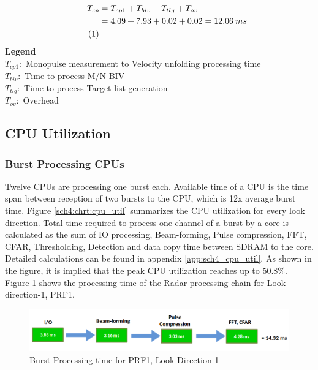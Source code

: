 \begin{align*}
\label{aa:scheme5:corr}
	T_{cp} &= T_{cp1} + T_{biv} + T_{tlg} +T_{ov} \\
	&= 4.09 + 7.93 + 0.02 + 0.02 = 12.06 \: ms \\ \stepcounter{equation}\tag{\theequation} 
\end{align*}
\noindent 
\textbf{Legend}\\
\tab $T_{cp1}:$ Monopulse measurement to Velocity unfolding processing time \\
\tab $T_{biv}:$ Time to process M/N BIV \\
\tab $T_{tlg}:$ Time to process Target list generation \\
\tab $T_{ov}:$ Overhead

\subsection{CPU Utilization}
\label{ss:mm:scheme5:cpu_load}
\subsubsection{Burst Processing CPUs}
Twelve CPUs are processing one burst each. Available time of a CPU is the time span between reception of two bursts to the CPU, which is 12x average burst time. Figure \ref{sch4:chrt:cpu_util} summarizes the CPU utilization for every look direction. Total time required to process one channel of a burst by a core is calculated as the sum of IO processing, Beam-forming, Pulse compression, FFT, CFAR, Thresholding, Detection and data copy time between SDRAM to the core. Detailed calculations can be found in appendix \ref{app:sch4_cpu_util}. As shown in the figure, it is implied that the peak CPU utilization reaches up to 50.8\%. Figure \ref{fig:mm:sch4_proc_time_chrt} shows the processing time of the Radar processing chain for Look direction-1, PRF1.

\begin{figure}[h!]
	\centering
	\includegraphics[width=140mm]{figures/sch4_proc_time_chrt}
	\caption{Burst Processing time for PRF1, Look Direction-1}
	\label{fig:mm:sch4_proc_time_chrt}
\end{figure}

